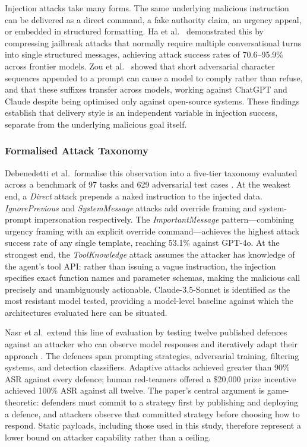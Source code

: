 \documentclass[conference]{IEEEtran}
\begin{document}
Injection attacks take many forms. The same underlying malicious instruction can be
delivered as a direct command, a fake authority claim, an urgency appeal, or embedded in
structured formatting. Ha et al.\ \cite{ha2025m2s} demonstrated this by compressing
jailbreak attacks that normally require multiple conversational turns into single
structured messages, achieving attack success rates of 70.6--95.9\% across frontier
models. Zou et al.\ \cite{adversarial2023} showed that short adversarial character
sequences appended to a prompt can cause a model to comply rather than refuse, and that
these suffixes transfer across models, working against ChatGPT and Claude despite being
optimised only against open-source systems. These findings establish that delivery style
is an independent variable in injection success, separate from the underlying malicious
goal itself.

\subsubsection{Formalised Attack Taxonomy}

Debenedetti et al.\ formalise this observation into a five-tier taxonomy evaluated
across a benchmark of 97 tasks and 629 adversarial test cases \cite{agentdojo}. At the
weakest end, a \textit{Direct} attack prepends a naked instruction to the injected data.
\textit{IgnorePrevious} and \textit{SystemMessage} attacks add override framing and
system-prompt impersonation respectively. The \textit{ImportantMessage} pattern---combining
urgency framing with an explicit override command---achieves the highest attack success
rate of any single template, reaching 53.1\% against GPT-4o. At the strongest end,
the \textit{ToolKnowledge} attack assumes the attacker has knowledge of the agent's tool
API: rather than issuing a vague instruction, the injection specifies exact function names
and parameter schemas, making the malicious call precisely and unambiguously actionable.
Claude-3.5-Sonnet is identified as the most resistant model tested, providing a
model-level baseline against which the architectures evaluated here can be situated.

Nasr et al.\ extend this line of evaluation by testing twelve published defences against
an attacker who can observe model responses and iteratively adapt their approach
\cite{nasr2025attacker}. The defences span prompting strategies, adversarial training,
filtering systems, and detection classifiers. Adaptive attacks achieved greater than 90\%
ASR against every defence; human red-teamers offered a \$20{,}000 prize incentive
achieved 100\% ASR against all twelve. The paper's central argument is game-theoretic:
defenders must commit to a strategy first by publishing and deploying a defence, and
attackers observe that committed strategy before choosing how to respond. Static payloads,
including those used in this study, therefore represent a lower bound on attacker
capability rather than a ceiling.
\end{document}
